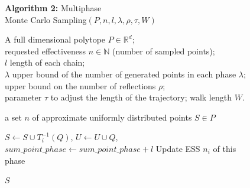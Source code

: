    \begin{figure}
      \centering
      \textbf{Algorithm 2:} Multiphase \\ Monte Carlo Sampling$(P, n, l, \lambda, \rho, \tau, W)$
      \medskip
      \begin{algorithmic}

      \REQUIRE
      A full dimensional polytope $P\in\mathbb{R}^d$; \\
      requested effectiveness $n\in\mathbb{N}$ (number of sampled points); \\
      $l$ length of each chain;\\ $\lambda$ upper bound of the number of generated points in each phase $\lambda$;  \\
      upper bound on the number of reflections $\rho$;\\
      parameter $\tau$ to adjust the length of the  trajectory; walk length $W$.

      \item[]
      
      \ENSURE
      a set $n$ of approximate uniformly distributed points $S\in P$

      \item[]



      
         

            \ENDFOR
            

            $S\leftarrow S\cup T_i^{-1}(Q)$,\;
            $U\leftarrow U\cup Q$,\;
            $sum\_point\_phase\leftarrow sum\_point\_phase + l$\;
            Update ESS $n_i$ of this phase\;
            \ENDIF

         \ENDWHILE

         
      \ENDWHILE
   
      \RETURN $S$
      \end{algorithmic}
      \label{alg:MMCS}
   \end{figure}



